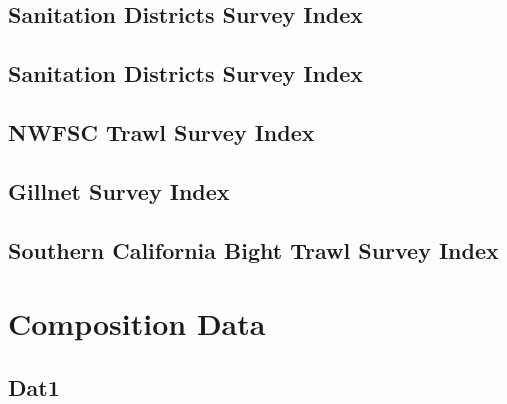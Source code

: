 \documentclass[ignorenonframetext,compress]{beamer}
\begin{document}
\begin{table}[ht]
\centering
{}
\end{table}

\subsection{Sanitation Districts Survey
Index}\label{sanitation-districts-survey-index-1}

\subsection{Sanitation Districts Survey
Index}\label{sanitation-districts-survey-index-2}

\subsection{NWFSC Trawl Survey Index}\label{nwfsc-trawl-survey-index}

\subsection{Gillnet Survey Index}\label{gillnet-survey-index}

\subsection{Southern California Bight Trawl Survey
Index}\label{southern-california-bight-trawl-survey-index}

\section{Composition Data}\label{composition-data}

\subsection{Dat1}\label{dat1}
\end{document}
